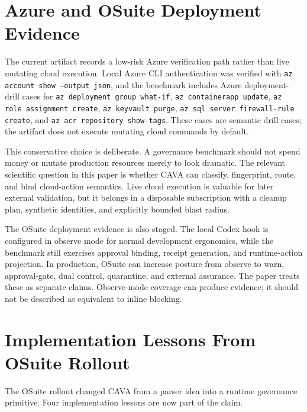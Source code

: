 \documentclass[11pt]{article}
\begin{document}
\section{Azure and OSuite Deployment Evidence}

The current artifact records a low-risk Azure verification path rather than live mutating cloud execution. Local Azure CLI authentication was verified with \texttt{az account show --output json}, and the benchmark includes Azure deployment-drill cases for \texttt{az deployment group what-if}, \texttt{az containerapp update}, \texttt{az role assignment create}, \texttt{az keyvault purge}, \texttt{az sql server firewall-rule create}, and \texttt{az acr repository show-tags}. These cases are semantic drill cases; the artifact does not execute mutating cloud commands by default.

This conservative choice is deliberate. A governance benchmark should not spend money or mutate production resources merely to look dramatic. The relevant scientific question in this paper is whether CAVA can classify, fingerprint, route, and bind cloud-action semantics. Live cloud execution is valuable for later external validation, but it belongs in a disposable subscription with a cleanup plan, synthetic identities, and explicitly bounded blast radius.

The OSuite deployment evidence is also staged. The local Codex hook is configured in observe mode for normal development ergonomics, while the benchmark still exercises approval binding, receipt generation, and runtime-action projection. In production, OSuite can increase posture from observe to warn, approval-gate, dual control, quarantine, and external assurance. The paper treats these as separate claims. Observe-mode coverage can produce evidence; it should not be described as equivalent to inline blocking.

\section{Implementation Lessons From OSuite Rollout}

The OSuite rollout changed CAVA from a parser idea into a runtime governance primitive. Four implementation lessons are now part of the claim.
\end{document}
